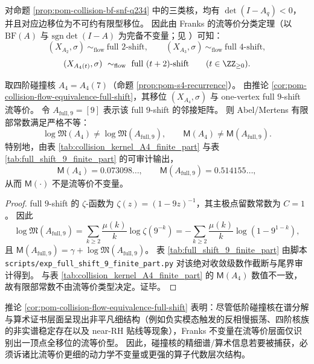 \begin{corollary}[低阶碰撞核的流等价类型]\label{cor:pom-collision-flow-equivalence-full-shift}
对命题 \ref{prop:pom-collision-bf-snf-q234} 中的三类核，均有 \(\det(I-A_q)<0\)，并且对应边移位为不可约有限型移位。
因此由 Franks 的流等价分类定理（以 \(\mathrm{BF}(A)\) 与 \(\mathrm{sgn}\det(I-A)\) 为完备不变量；见 \cite{Franks1984FlowEquivalenceSFT}）可知：
\[
(X_{A_2},\sigma)\ \sim_{\mathrm{flow}}\ \text{full }2\text{-shift},\qquad
(X_{A_3},\sigma)\ \sim_{\mathrm{flow}}\ \text{full }4\text{-shift},
\]
\[
(X_{A_4(t)},\sigma)\ \sim_{\mathrm{flow}}\ \text{full }(t+2)\text{-shift}\qquad(t\in\ZZ_{\ge 0}).
\]
\end{corollary}

\begin{proposition}\label{prop:pom-mertens-not-flow-invariant}
取四阶碰撞核 \(A_4=A_4(7)\)（命题 \ref{prop:pom-s4-recurrence}）。
由推论 \ref{cor:pom-collision-flow-equivalence-full-shift}，其移位 \((X_{A_4},\sigma)\) 与 one-vertex full \(9\)-shift 流等价。
令 \(A_{\mathrm{full},9}=[9]\) 表示该 full \(9\)-shift 的邻接矩阵。
则 Abel/Mertens 有限部常数满足严格不等：
\[
\log\mathfrak{M}(A_4)\neq \log\mathfrak{M}(A_{\mathrm{full},9}),
\qquad
\mathsf{M}(A_4)\neq \mathsf{M}(A_{\mathrm{full},9}).
\]
特别地，由表 \ref{tab:collision_kernel_A4_finite_part} 与表 \ref{tab:full_shift_9_finite_part} 的可审计输出，
\[
\mathsf{M}(A_4)=0.073098\ldots,
\qquad
\mathsf{M}(A_{\mathrm{full},9})=0.514155\ldots,
\]
从而 \(\mathsf{M}(\cdot)\) 不是流等价不变量。
\end{proposition}
\begin{proof}
full \(9\)-shift 的 \(\zeta\)-函数为 \(\zeta(z)=(1-9z)^{-1}\)，其主极点留数常数为 \(C=1\)。
因此
\[
\log\mathfrak{M}(A_{\mathrm{full},9})
=\sum_{k\ge 2}\frac{\mu(k)}{k}\log\zeta\!\left(9^{-k}\right)
=-\sum_{k\ge 2}\frac{\mu(k)}{k}\log\!\left(1-9^{1-k}\right),
\]
且 \(\mathsf{M}(A_{\mathrm{full},9})=\gamma+\log\mathfrak{M}(A_{\mathrm{full},9})\)。
表 \ref{tab:full_shift_9_finite_part} 由脚本 \texttt{scripts/exp\_full\_shift\_9\_finite\_part.py} 对该绝对收敛级数作截断与尾界审计得到。
与表 \ref{tab:collision_kernel_A4_finite_part} 的 \(\mathsf{M}(A_4)\) 数值不一致，故有限部常数不由流等价类型决定。证毕。
\end{proof}

\begin{remark}[流等价不变量的塌缩与细谱信息的不可见性]\label{rem:pom-collision-flow-collapse}
推论 \ref{cor:pom-collision-flow-equivalence-full-shift} 表明：尽管低阶碰撞核在谱分解与算术证书层面呈现出非平凡细结构（例如负实模态触发的反相慢振荡、四阶核族的非实谱稳定存在以及 near-RH 贴线等现象），Franks 不变量在流等价层面仅识别出一顶点全移位的流等价型。
因此，碰撞核的精细谱/算术信息若要被捕获，必须诉诸比流等价更细的动力学不变量或更强的算子代数层次结构。
\end{remark}

